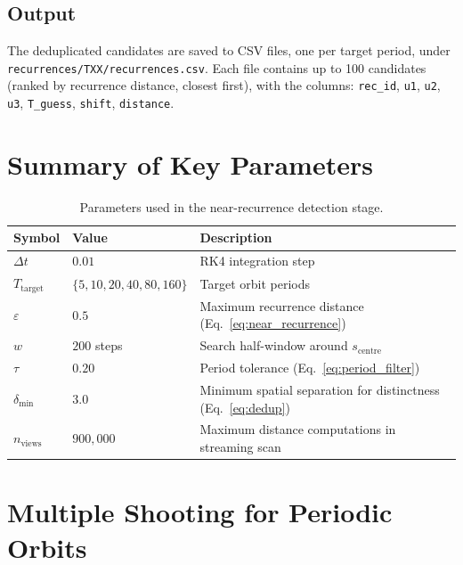 \documentclass[11pt,a4paper]{article}
\begin{document}
\subsection{Output}
The deduplicated candidates are saved to CSV files, one per target period,
under \texttt{recurrences/TXX/recurrences.csv}.  Each file contains up to 100
candidates (ranked by recurrence distance, closest first), with the columns:
\texttt{rec\_id}, \texttt{u1}, \texttt{u2}, \texttt{u3}, \texttt{T\_guess},
\texttt{shift}, \texttt{distance}.

\section{Summary of Key Parameters}

\begin{table}[htbp]
  \centering
  \caption{Parameters used in the near-recurrence detection stage.}
  \label{tab:parameters}
  \begin{tabular}{@{}lll@{}}
    \toprule
    \textbf{Symbol} & \textbf{Value} & \textbf{Description} \\
    \midrule
    $\Delta t$          & $0.01$           & RK4 integration step \\
    $T_{\text{target}}$ & $\{5,10,20,40,80,160\}$ & Target orbit periods \\
    $\varepsilon$       & $0.5$            & Maximum recurrence distance (Eq.~\ref{eq:near_recurrence}) \\
    $w$                 & $200$ steps      & Search half-window around $s_{\text{centre}}$ \\
    $\tau$              & $0.20$           & Period tolerance (Eq.~\ref{eq:period_filter}) \\
    $\delta_{\min}$     & $3.0$            & Minimum spatial separation for distinctness (Eq.~\ref{eq:dedup}) \\
    $n_{\text{views}}$  & $900,\!000$      & Maximum distance computations in streaming scan \\
    \bottomrule
  \end{tabular}
\end{table}

\section{Multiple Shooting for Periodic Orbits}\label{sec:multiple_shooting}
\end{document}
